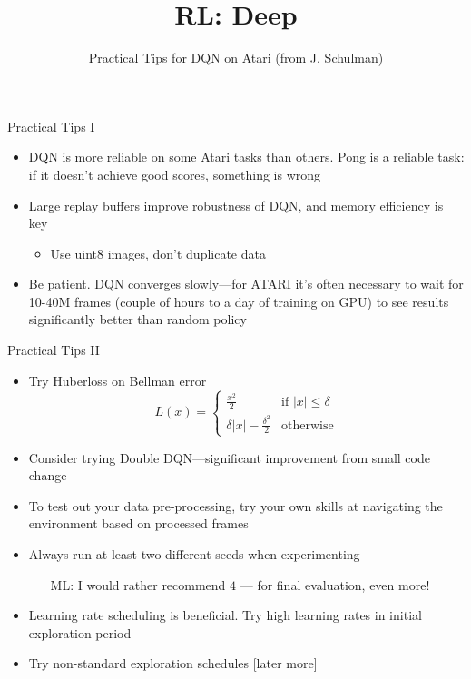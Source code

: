 \documentclass[aspectratio=169]{../latex_main/tntbeamer}  %
\title[RL: Deep Reinforcement Learning]{RL: Deep}
\subtitle{Practical Tips for DQN on Atari (from J. Schulman)}
\begin{document}
	
	\maketitle

\begin{frame}[c]{Practical Tips I}
	
	\begin{itemize}
		\item DQN is more reliable on some Atari tasks than others. Pong is a
		reliable task: if it doesn’t achieve good scores, something is wrong
		\item Large replay buffers improve robustness of DQN, and memory
		efficiency is key
		\begin{itemize}
			\item Use uint8 images, don’t duplicate data
		\end{itemize}
		\item Be patient. DQN converges slowly—for ATARI it’s often necessary to
		wait for 10-40M frames (couple of hours to a day of training on GPU)
		to see results significantly better than random policy
	\end{itemize}
	
\end{frame}
\begin{frame}[c]{Practical Tips II}
	
	\begin{itemize}
		\item Try Huberloss on Bellman error
		$$L(x) =  \begin{cases}
		\frac{x^2}{2} & \text{if } |x| \leq \delta\\
		\delta |x| - \frac{\delta^2}{2} & \text{otherwise}
		\end{cases}
		$$
		\item Consider trying Double DQN—significant improvement from small
		code change 
		\item To test out your data pre-processing, try your own skills at navigating
		the environment based on processed frames
		\item Always run at least two different seeds when experimenting
		\begin{itemize}
			\item [ML:] I would rather recommend $4$ --- for final evaluation, even more!
		\end{itemize}
		\item Learning rate scheduling is beneficial. Try high learning rates in initial
		exploration period
		\item Try non-standard exploration schedules [later more]
	\end{itemize}
	
\end{frame}
\end{document}
